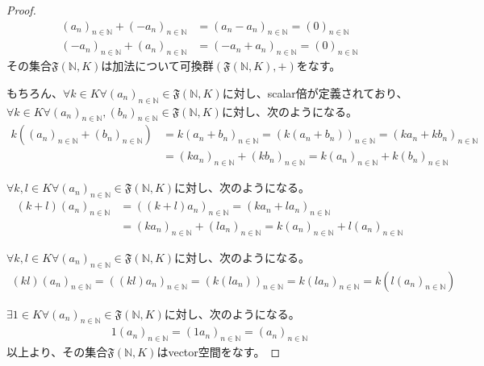 \documentclass[dvipdfmx]{jsarticle}
\begin{document}
\begin{proof}
\begin{align*}
\left( a_{n} \right)_{n \in \mathbb{N}} + \left( - a_{n} \right)_{n \in \mathbb{N}} &= \left( a_{n} - a_{n} \right)_{n \in \mathbb{N}} = (0)_{n \in \mathbb{N}}\\
\left( - a_{n} \right)_{n \in \mathbb{N}} + \left( a_{n} \right)_{n \in \mathbb{N}} &= \left( - a_{n} + a_{n} \right)_{n \in \mathbb{N}} = (0)_{n \in \mathbb{N}}
\end{align*}
その集合$\mathfrak{F}\left( \mathbb{N},K \right)$は加法について可換群$\left( \mathfrak{F}\left( \mathbb{N},K \right), + \right)$をなす。\par
もちろん、$\forall k \in K\forall\left( a_{n} \right)_{n \in \mathbb{N}}\in \mathfrak{F}\left( \mathbb{N},K \right)$に対し、scalar倍が定義されており、$\forall k \in K\forall\left( a_{n} \right)_{n \in \mathbb{N}},\left( b_{n} \right)_{n \in \mathbb{N}}\in \mathfrak{F}\left( \mathbb{N},K \right)$に対し、次のようになる。
\begin{align*}
k\left( \left( a_{n} \right)_{n \in \mathbb{N}} + \left( b_{n} \right)_{n \in \mathbb{N}} \right) &= k\left( a_{n} + b_{n} \right)_{n \in \mathbb{N}} = \left( k\left( a_{n} + b_{n} \right) \right)_{n \in \mathbb{N}} = \left( ka_{n} + kb_{n} \right)_{n \in \mathbb{N}}\\
&= \left( ka_{n} \right)_{n \in \mathbb{N}} + \left( kb_{n} \right)_{n \in \mathbb{N}} = k\left( a_{n} \right)_{n \in \mathbb{N}} + k\left( b_{n} \right)_{n \in \mathbb{N}}
\end{align*}\par
$\forall k,l \in K\forall\left( a_{n} \right)_{n \in \mathbb{N}}\in \mathfrak{F}\left( \mathbb{N},K \right)$に対し、次のようになる。
\begin{align*}
(k + l)\left( a_{n} \right)_{n \in \mathbb{N}} &= \left( (k + l)a_{n} \right)_{n \in \mathbb{N}} = \left( ka_{n} + la_{n} \right)_{n \in \mathbb{N}}\\
&= \left( ka_{n} \right)_{n \in \mathbb{N}} + \left( la_{n} \right)_{n \in \mathbb{N}} = k\left( a_{n} \right)_{n \in \mathbb{N}} + l\left( a_{n} \right)_{n \in \mathbb{N}}
\end{align*}\par
$\forall k,l \in K\forall\left( a_{n} \right)_{n \in \mathbb{N}}\in \mathfrak{F}\left( \mathbb{N},K \right)$に対し、次のようになる。
\begin{align*}
(kl)\left( a_{n} \right)_{n \in \mathbb{N}} = \left( (kl)a_{n} \right)_{n \in \mathbb{N}} = \left( k\left( la_{n} \right) \right)_{n \in \mathbb{N}} = k\left( la_{n} \right)_{n \in \mathbb{N}} = k\left( l\left( a_{n} \right)_{n \in \mathbb{N}} \right)
\end{align*}\par
$\exists 1 \in K\forall\left( a_{n} \right)_{n \in \mathbb{N}}\in \mathfrak{F}\left( \mathbb{N},K \right)$に対し、次のようになる。
\begin{align*}
1\left( a_{n} \right)_{n \in \mathbb{N}} = \left( 1a_{n} \right)_{n \in \mathbb{N}} = \left( a_{n} \right)_{n \in \mathbb{N}}
\end{align*}
以上より、その集合$\mathfrak{F}\left( \mathbb{N},K \right)$はvector空間をなす。
\end{proof}
\end{document}
